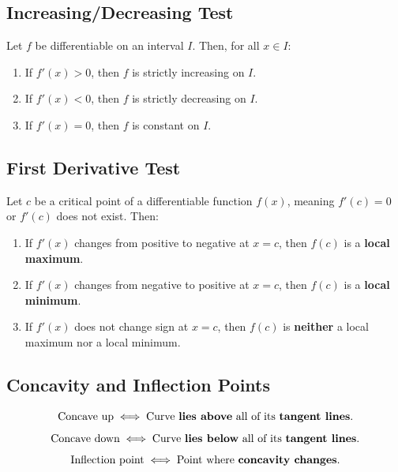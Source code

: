 \documentclass[a4paper,11pt]{article}
\begin{document}


\subsection{Increasing/Decreasing Test}

\begin{tcolorbox}
    Let $f$ be differentiable on an interval $I$. Then, for all $x \in I$:
    \begin{enumerate}
        \item If $f'(x) > 0$, then $f$ is strictly increasing on $I$.
        \item If $f'(x) < 0$, then $f$ is strictly decreasing on $I$.
        \item If $f'(x) = 0$, then $f$ is constant on $I$.
    \end{enumerate}
\end{tcolorbox}




\subsection{First Derivative Test}

\begin{tcolorbox}
    Let $c$ be a critical point of a differentiable function $f(x)$, meaning $f'(c)=0$ or $f'(c)$ does not exist. Then:
    \begin{enumerate}
        \item If $f'(x)$ changes from positive to negative at $x=c$, then $f(c)$ is a \textbf{local maximum}.
        \item If $f'(x)$ changes from negative to positive at $x=c$, then $f(c)$ is a \textbf{local minimum}.
        \item If $f'(x)$ does not change sign at $x=c$, then $f(c)$ is \textbf{neither} a local maximum nor a local minimum.
    \end{enumerate}
\end{tcolorbox}




\subsection{Concavity and Inflection Points}

\begin{tcolorbox}
    \[\text{Concave up} \iff \text{Curve \textbf{lies above} all of its \textbf{tangent lines}}.\]
    \[\text{Concave down} \iff \text{Curve \textbf{lies below} all of its \textbf{tangent lines}}.\]
    \[\text{Inflection point} \iff \text{Point where \textbf{concavity changes}}.\]
\end{tcolorbox}
\end{document}
